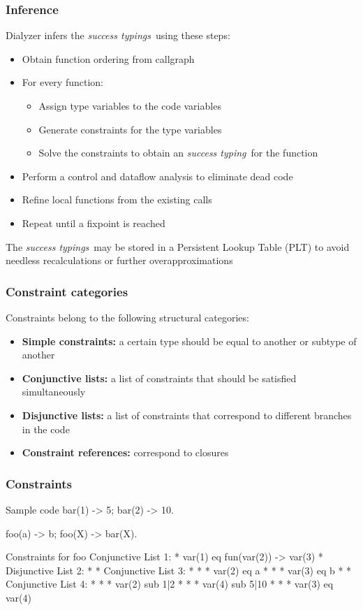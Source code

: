 \documentclass{beamer}
\newcommand{\st}{\emph{success typing}}
\newcommand{\sts}{\emph{success typings}}
\begin{document}
\begin{frame}
  \frametitle{Inference}
  Dialyzer infers the \sts\ using these steps:
  \begin{itemize}
  \item Obtain function ordering from callgraph \pause
  \item For every function:
    \begin{itemize}
    \item Assign type variables to the code variables \pause
    \item Generate constraints for the type variables \pause
    \item Solve the constraints to obtain an \st\ for the function \pause
    \end{itemize}
  \item Perform a control and dataflow analysis to eliminate dead code \pause
  \item Refine local functions from the existing calls \pause
  \item Repeat until a fixpoint is reached \pause
  \end{itemize}
  The \sts\ may be stored in a Persistent Lookup Table (PLT) to avoid
  needless recalculations or further overapproximations
\end{frame}

\begin{frame}
  \frametitle{Constraint categories}
  Constraints belong to the following structural categories: \pause
  \begin{itemize}
  \item \textbf{Simple constraints:} a certain type should be equal to
    another or subtype of another \pause
  \item \textbf{Conjunctive lists:} a list of constraints that should be
    satisfied simultaneously \pause
  \item \textbf{Disjunctive lists:} a list of constraints that
    correspond to different branches in the code \pause
  \item \textbf{Constraint references:} correspond to closures
  \end{itemize}
\end{frame}

\begin{frame}[fragile]
  \frametitle{Constraints}
\begin{code}{Sample code}
bar(1) -> 5;
bar(2) -> 10.

foo(a) -> b;
foo(X) -> bar(X).
\end{code}
\begin{code}{Constraints for foo}
Conjunctive List 1:
 * var(1) eq fun(var(2)) -> var(3)
 * Disjunctive List 2:
 *  * Conjunctive List 3:
 *  *  * var(2) eq a
 *  *  * var(3) eq b
 *  * Conjunctive List 4:
 *  *  * var(2) sub 1|2
 *  *  * var(4) sub 5|10
 *  *  * var(3) eq var(4)
\end{code}
\end{frame}
\end{document}
